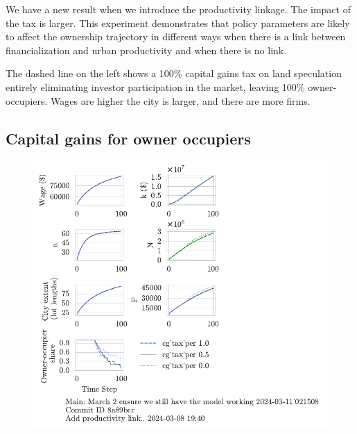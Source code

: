 We have a new result when we introduce the productivity linkage. 
The impact of the tax is larger. This experiment demonstrates that policy parameters are likely to affect the ownership trajectory in different ways when there is a link between financialization and urban productivity and when there is no link.

The dashed line on the left shows a 100\% capital gains tax on land speculation entirely eliminating investor participation in the market, leaving 100\%  owner-occupiers.  Wages are higher the city is larger, and there are more firms. 

\newpage
\subsection{Capital gains for owner occupiers}
\begin{figure}[h!tb] 
    \centering
    \includegraphics[scale=.75, trim={0 1.4cm 4.5cm 0},clip]{fig/cg_tax_per-Main-021508.pdf} 

\end{figure}

